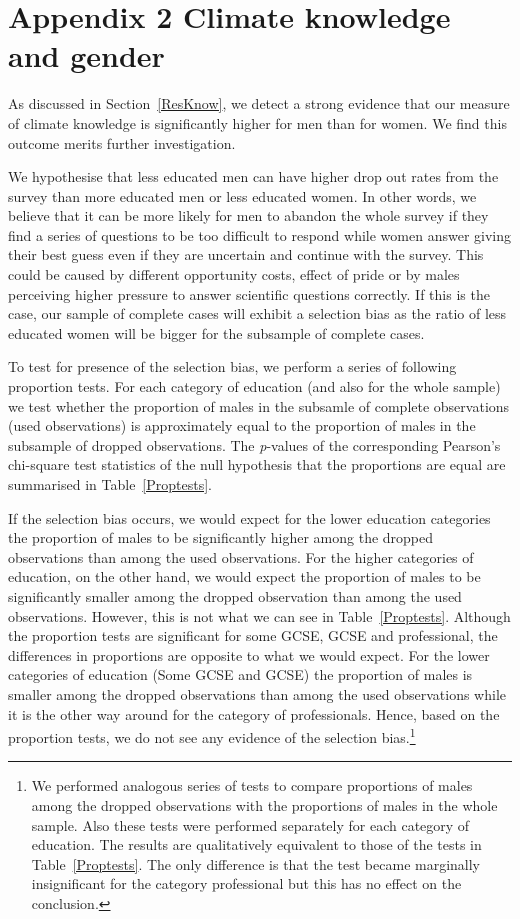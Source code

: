 \documentclass[a4paper,12pt]{article}
\begin{document}
\section{Appendix 2 Climate knowledge and gender}



As discussed in Section~\ref{ResKnow}, we detect a strong evidence that our measure of climate knowledge is significantly higher for men than for women. We find this outcome merits further investigation. 

We hypothesise that less educated men can have higher drop out rates from the survey than more educated men or less educated women. In other words, we believe that it can be more likely for men to abandon the whole survey if they find a series of questions to be too difficult to respond while women answer giving their best guess even if they are uncertain and continue with the survey. This could be caused by different opportunity costs, effect of pride or by males perceiving higher pressure to answer scientific questions correctly. If this is the case, our sample of complete cases will exhibit a selection bias as the ratio of less educated women will be bigger for the subsample of complete cases.

To test for presence of the selection bias, we perform a series of following proportion tests. For each category of education (and also for the whole sample) we test whether the proportion of males in the subsamle of complete observations (used observations) is approximately equal to the proportion of males in the subsample of dropped observations. The \textit{p}-values of the corresponding Pearson's chi-square test statistics of the null hypothesis that the proportions are equal are summarised in Table~\ref{Proptests}.

If the selection bias occurs, we would expect for the lower education categories the proportion of males to be significantly higher among the dropped observations than among the used observations. For the higher categories of education, on the other hand, we would expect the proportion of males to be significantly smaller among the dropped observation than among the used observations. However, this is not what we can see in Table~\ref{Proptests}. Although the proportion tests are significant for some GCSE, GCSE and professional, the differences in proportions are opposite to what we would expect. For the lower categories of education (Some GCSE and GCSE) the proportion of males is smaller among the dropped observations than among the used observations while it is the other way around for the category of professionals. Hence, based on the proportion tests, we do not see any evidence of the selection bias.\footnote{We performed analogous series of tests to compare proportions of males among the dropped observations with the proportions of males in the whole sample. Also these tests were performed separately for each category of education. The results are qualitatively equivalent to those of the tests in Table~\ref{Proptests}. The only difference is that the test became marginally insignificant for the category professional but this has no effect on the conclusion.}
\end{document}
